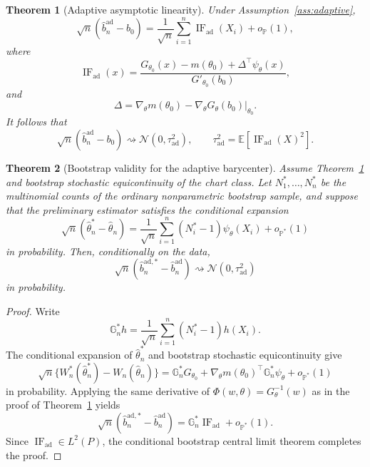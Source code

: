 \documentclass[10pt,a4paper]{amsart}
\newtheorem{theorem}{Theorem}
\newcommand{\E}{\mathbb{E}}
\newcommand{\IF}{\operatorname{IF}}
\newcommand{\Prob}{\mathbb{P}}
\begin{document}
\begin{theorem}[Adaptive asymptotic linearity]\label{thm:adaptive-al}
Under Assumption~\ref{ass:adaptive},
\[
\sqrt n(\widehat b_n^{\mathrm{ad}}-b_0)
=
\frac1{\sqrt n}\sum_{i=1}^n\IF_{\mathrm{ad}}(X_i)+o_{\Prob}(1),
\]
where
\[
\IF_{\mathrm{ad}}(x)
=
\frac{
G_{\theta_0}(x)-m(\theta_0)
+
\Delta^\top\psi_\theta(x)
}
{G'_{\theta_0}(b_0)},
\]
and
\[
\Delta
=
\nabla_\theta m(\theta_0)
-
\nabla_\theta G_\theta(b_0)\big|_{\theta_0}.
\]
It follows that
\[
\sqrt n(\widehat b_n^{\mathrm{ad}}-b_0)
\rightsquigarrow
\mathcal N(0,\tau_{\mathrm{ad}}^2),
\qquad
\tau_{\mathrm{ad}}^2=\E[\IF_{\mathrm{ad}}(X)^2].
\]
\end{theorem}

\begin{theorem}[Bootstrap validity for the adaptive barycenter]\label{thm:adaptive-bootstrap}
Assume Theorem~\ref{thm:adaptive-al} and bootstrap stochastic equicontinuity of the chart class. Let $N_1^*,\ldots,N_n^*$ be the multinomial counts of the ordinary nonparametric bootstrap sample, and suppose that the preliminary estimator satisfies the conditional expansion
\[
\sqrt n(\widehat\theta_n^*-\widehat\theta_n)
=
\frac1{\sqrt n}\sum_{i=1}^n
(N_i^*-1)\psi_\theta(X_i)
+o_{\Prob^*}(1)
\]
in probability. Then, conditionally on the data,
\[
\sqrt n\left(
\widehat b_n^{\mathrm{ad},*}-\widehat b_n^{\mathrm{ad}}
\right)
\rightsquigarrow
\mathcal N(0,\tau_{\mathrm{ad}}^2)
\]
in probability.
\end{theorem}

\begin{proof}
Write
\[
\mathbb G_n^*h
=
\frac1{\sqrt n}\sum_{i=1}^n(N_i^*-1)h(X_i).
\]
The conditional expansion of $\widehat\theta_n^*$ and bootstrap stochastic equicontinuity give
\[
\sqrt n\{W_n^*(\widehat\theta_n^*)-W_n(\widehat\theta_n)\}
=
\mathbb G_n^*G_{\theta_0}
+\nabla_\theta m(\theta_0)^\top
\mathbb G_n^*\psi_\theta
+o_{\Prob^*}(1)
\]
in probability. Applying the same derivative of $\Phi(w,\theta)=G_\theta^{-1}(w)$ as in the proof of Theorem~\ref{thm:adaptive-al} yields
\[
\sqrt n(\widehat b_n^{\mathrm{ad},*}-\widehat b_n^{\mathrm{ad}})
=
\mathbb G_n^*\IF_{\mathrm{ad}}+o_{\Prob^*}(1).
\]
Since $\IF_{\mathrm{ad}}\in L^2(P)$, the conditional bootstrap central limit theorem completes the proof.
\end{proof}
\end{document}
